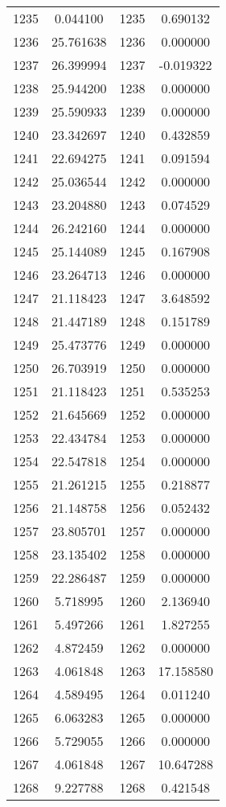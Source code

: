 \documentclass[12pt]{article}
\begin{document}
\begin{longtable}{@{}cccc@{}}
1235 & 0.044100 & 1235 & 0.690132 \\
1236 & 25.761638 & 1236 & 0.000000 \\
1237 & 26.399994 & 1237 & -0.019322 \\
1238 & 25.944200 & 1238 & 0.000000 \\
1239 & 25.590933 & 1239 & 0.000000 \\
1240 & 23.342697 & 1240 & 0.432859 \\
1241 & 22.694275 & 1241 & 0.091594 \\
1242 & 25.036544 & 1242 & 0.000000 \\
1243 & 23.204880 & 1243 & 0.074529 \\
1244 & 26.242160 & 1244 & 0.000000 \\
1245 & 25.144089 & 1245 & 0.167908 \\
1246 & 23.264713 & 1246 & 0.000000 \\
1247 & 21.118423 & 1247 & 3.648592 \\
1248 & 21.447189 & 1248 & 0.151789 \\
1249 & 25.473776 & 1249 & 0.000000 \\
1250 & 26.703919 & 1250 & 0.000000 \\
1251 & 21.118423 & 1251 & 0.535253 \\
1252 & 21.645669 & 1252 & 0.000000 \\
1253 & 22.434784 & 1253 & 0.000000 \\
1254 & 22.547818 & 1254 & 0.000000 \\
1255 & 21.261215 & 1255 & 0.218877 \\
1256 & 21.148758 & 1256 & 0.052432 \\
1257 & 23.805701 & 1257 & 0.000000 \\
1258 & 23.135402 & 1258 & 0.000000 \\
1259 & 22.286487 & 1259 & 0.000000 \\
1260 & 5.718995 & 1260 & 2.136940 \\
1261 & 5.497266 & 1261 & 1.827255 \\
1262 & 4.872459 & 1262 & 0.000000 \\
1263 & 4.061848 & 1263 & 17.158580 \\
1264 & 4.589495 & 1264 & 0.011240 \\
1265 & 6.063283 & 1265 & 0.000000 \\
1266 & 5.729055 & 1266 & 0.000000 \\
1267 & 4.061848 & 1267 & 10.647288 \\
1268 & 9.227788 & 1268 & 0.421548 \\

\end{longtable}
\end{document}
